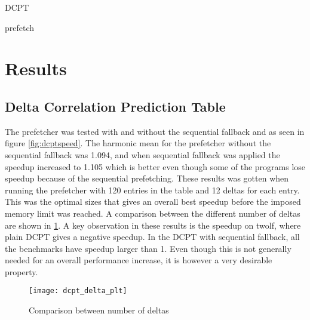 \documentclass[12pt,journal,compsoc]{IEEEtran}
\begin{document}
\begin{algorithm}
\dontprintsemicolon
{}

\caption{DCPT\label{dcpt}}
\end{algorithm}

\begin{algorithm}
\dontprintsemicolon
{}

\caption{prefetch\label{pre}}
\end{algorithm}

\section{Results}
\subsection{Delta Correlation Prediction Table}
The prefetcher was tested with and without the sequential fallback and as seen in figure \ref{fig:dcptspeed}. The harmonic mean for the prefetcher without the sequential fallback was 1.094, and when sequential fallback was applied the speedup increased to 1.105 which is better even though some of the programs lose 
speedup because of the sequential prefetching. These results was gotten when running the prefetcher with 120 entries in the table and 12 deltas for each entry. This was the optimal sizes that gives an overall best speedup before the
imposed memory limit was reached. A comparison between the different number of deltas are shown in \ref{fig:deltas}.
A key observation in these results is the speedup on twolf, where plain DCPT gives a negative speedup. In the DCPT with sequential fallback, all the benchmarks have speedup larger than 1. Even though this is not generally needed for
an overall performance increase, it is however a very desirable property.

\begin{figure}
\begin{center}
\texttt{[image: dcpt\_delta\_plt]}
\end{center}
\caption{\label{fig:deltas} Comparison between number of deltas}
\end{figure}
\end{document}
